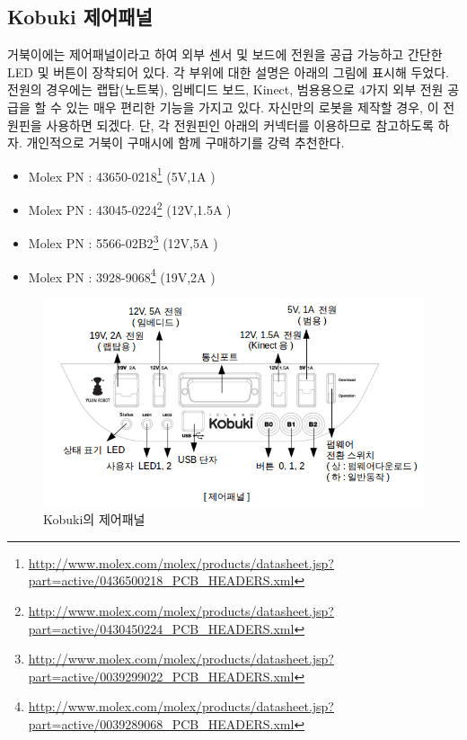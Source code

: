 \subsection{Kobuki 제어패널}

거북이에는 제어패널이라고 하여 외부 센서 및 보드에 전원을 공급 가능하고 간단한 LED 및 버튼이 장착되어 있다. 각 부위에 대한 설명은 아래의 그림에 표시해 두었다.전원의 경우에는 랩탑(노트북), 임베디드 보드, Kinect, 범용용으로 4가지 외부 전원 공급을 할 수 있는 매우 편리한 기능을 가지고 있다. 자신만의 로봇을 제작할 경우, 이 전원핀을 사용하면 되겠다. 단, 각 전원핀인 아래의 커넥터를 이용하므로 참고하도록 하자. 개인적으로 거북이 구매시에 함께 구매하기를 강력 추천한다.

\begin{itemize}[leftmargin=*]
\item Molex PN : 43650-0218\footnote{\scriptsize\url{http://www.molex.com/molex/products/datasheet.jsp?part=active/0436500218_PCB_HEADERS.xml}} (5V,1A )
\item Molex PN : 43045-0224\footnote{\scriptsize\url{http://www.molex.com/molex/products/datasheet.jsp?part=active/0430450224_PCB_HEADERS.xml}} (12V,1.5A )
\item Molex PN : 5566-02B2\footnote{\scriptsize\url{http://www.molex.com/molex/products/datasheet.jsp?part=active/0039299022_PCB_HEADERS.xml}}  (12V,5A )
\item Molex PN : 3928-9068\footnote{\scriptsize\url{http://www.molex.com/molex/products/datasheet.jsp?part=active/0039289068_PCB_HEADERS.xml}}  (19V,2A )
\end{itemize}

\begin{figure}[h]
\centering\includegraphics[width=0.8\columnwidth]{pictures/chapter10/kobuki_pannel.png}
\caption{Kobuki의 제어패널}
\end{figure}

